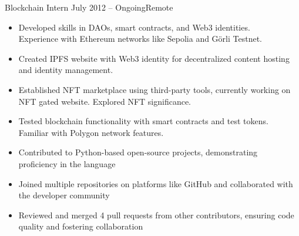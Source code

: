 \documentclass[10pt,a4paper,ragged2e,withhyper]{altacv}
\begin{document}


\makecvheader



\begin{paracol}{2}


 {Blockchain Intern} 
{July 2012 -- Ongoing}{Remote}
\begin{itemize}
\item  Developed skills in DAOs, smart contracts, and Web3 identities.\\ 
Experience with Ethereum networks like Sepolia and Görli Testnet.
\item Created IPFS website with Web3 identity for decentralized content hosting and identity management.
\item Established NFT marketplace using third-party tools, currently working on NFT gated website. Explored NFT significance.
\item Tested blockchain functionality with smart contracts and test tokens.\\
Familiar with Polygon network features.
\end{itemize}

\divider

\begin{itemize}
\item  Contributed to Python-based open-source projects, demonstrating \\proficiency in the language
\item  Joined multiple repositories on platforms like GitHub and collaborated with the developer community
\item  Reviewed and merged 4 pull requests from other contributors, ensuring code quality and fostering collaboration
\end{itemize}


\end{paracol}
\end{document}
